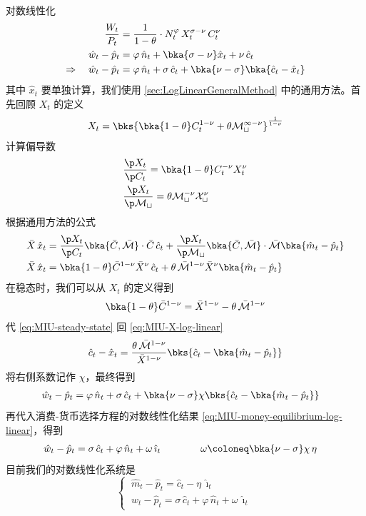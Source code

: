 \myskip
{}

对数线性化
\begin{align*}
    \dfrac{W_t}{P_t}&=\dfrac1{1-\theta}\cdot N_t^\varphi\,X_t^{\sigma-\nu}\,C_t^\nu\\
    \hat w_t-\hat p_t&=\varphi\,\hat n_t+\bka{\sigma-\nu}\hat x_t+\nu\,\hat c_t\\
    \Rightarrow\quad \hat w_t-\hat p_t&=\varphi\,\hat n_t+\sigma\,\hat c_t+\bka{\nu-\sigma}\bka{\hat c_t-\hat x_t}
\end{align*}
其中 \(\hat x_t\) 要单独计算，我们使用 \ref{sec:LogLinearGeneralMethod} 中的通用方法。首先回顾 \(X_t\) 的定义
\begin{align}
    X_t=\bks{\bka{1-\theta}C_t^{1-\nu}+\theta\cal M_t^{1-\nu}}^{\frac{1}{1-\nu}}\label{eq:MIU-X}
\end{align}
计算偏导数
\begin{align*}
    &\dfrac{\p X_t}{\p C_t}=\bka{1-\theta}C_t^{-\nu}X_t^\nu\\
    &\dfrac{\p X_t}{\p \cal M_t}=\theta\cal M_t^{-\nu}X_t^\nu
\end{align*}
根据通用方法的公式
\begin{align}
    \bar X\,\hat x_t&=\dfrac{\p X_t}{\p C_t}\bka{\bar C,\bar{\cal M}}\cdot \bar C\,\hat c_t+\dfrac{\p X_t}{\p \cal M_t}\bka{\bar C,\bar{\cal M}}\cdot \bar{\cal M}\bka{\hat m_t-\hat p_t}\notag\\
    \bar X\,\hat x_t&=\bka{1-\theta}\bar C^{1-\nu}\bar X^\nu\,\hat c_t+\theta\,\bar{\cal M}^{1-\nu}\bar X^\nu\bka{\hat m_t-\hat p_t}\label{eq:MIU-X-log-linear}
\end{align}
在稳态时，我们可以从 \(X_t\) 的定义得到
\begin{align}
    \bka{1-\theta}\bar C^{1-\nu}=\bar X^{1-\nu}-\theta\,\bar{\cal M}^{1-\nu}\label{eq:MIU-steady-state}
\end{align}
代 \ref{eq:MIU-steady-state} 回 \ref{eq:MIU-X-log-linear}
\begin{align*}
    \hat c_t-\hat x_t=\dfrac{\theta\,\bar{\cal M}^{1-\nu}}{\bar X^{1-\nu}}\bks{\hat c_t-\bka{\hat m_t-\hat p_t}}
\end{align*}
将右侧系数记作 \(\chi\)，最终得到
\begin{align*}
    \hat w_t-\hat p_t&=\varphi\,\hat n_t+\sigma\,\hat c_t+\bka{\nu-\sigma}\chi\bks{\hat c_t-\bka{\hat m_t-\hat p_t}}
\end{align*}
再代入消费-货币选择方程的对数线性化结果 \ref{eq:MIU-money-equilibrium-log-linear}，得到
\begin{align}
    \hat w_t-\hat p_t&=\sigma\,\hat c_t+\varphi\,\hat n_t+\omega\,\hat\imath_t\qquad\qquad\omega\coloneq\bka{\nu-\sigma}\chi\,\eta\label{eq:MIU-labor-equilibrium-log-linear}
\end{align}
目前我们的对数线性化系统是
\begin{equation*}
    \begin{cases}
        \ \hat m_t-\hat p_t=\hat c_t-\eta\,\hat\imath_t\\
        \ \hat w_t-\hat p_t=\sigma\,\hat c_t+\varphi\,\hat n_t+\omega\,\hat\imath_t
    \end{cases}
\end{equation*}

